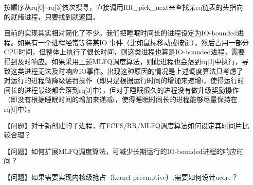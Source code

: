 按顺序从rq{[}0{]}\textasciitilde{}rq{[}3{]}依次搜寻，直接调用RR\_pick\_next来查找某rq链表的头指向的就绪进程，只要找到就返回。

目前的实现其实相对简化了不少。我们把睡眠时间长的进程设定为IO-bounded进程。如果有一个进程经常等待某IO
事件（比如鼠标移动或按键），然后占用一部分CPU时间，但整体上执行了很长时间，则这类进程也算是IO-bounded进程，需要得到及时响应。如果采用上述MLFQ调度算法，则此进程也会落到rq{[}3{]}中执行，导致这类进程无法及时响应IO事件。出现这种原因的情况是上述调度算法只考虑了对运行的进程做降级惩罚操作（即只是根据运行时间的增加来递增i，使得运行时间长的进程最终都会落到rq{[}3{]}中），但对于睡眠很久的进程没有做升级奖励操作（即没有根据睡眠时间的增加来递减i，使得睡眠时间长的进程能够尽量保持在rq{[}0{]}中）。

【问题】对于新创建的子进程，在FCFS/RR/MLFQ调度算法如何设定其时间片比较合理？

【问题】如何扩展MLFQ调度算法，可减少长期运行的IO-bounded进程的响应时间？

【问题】如果需要实现内核级抢占（kernel preemptive）,需要如何设计ucore？
